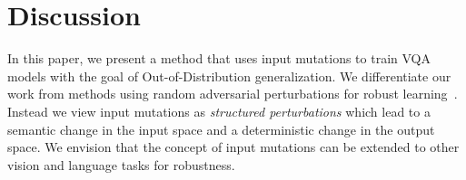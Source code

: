     


\section{Discussion}
In this paper, we present a method that uses input mutations to train VQA models with the goal of Out-of-Distribution generalization.
We differentiate our work from methods using random adversarial perturbations for robust learning~\citep{madry2018towards}.
Instead we view input mutations as \textit{structured perturbations} which lead to a semantic change in the input space and a deterministic change in the output space.
We envision that the concept of input mutations can be extended to other vision and language tasks for robustness.


